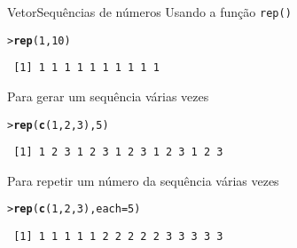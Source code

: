 \documentclass[10pt,handout]{beamer}\usepackage{graphicx, color}
\makeatletter
\newcommand{\hlfunctioncall}[1]{\textcolor[rgb]{0,0,0.545098039215686}{\textbf{#1}}}%
\newenvironment{kframe}{%
 \def\at@end@of@kframe{}%
 \ifinner\ifhmode%
  \def\at@end@of@kframe{\end{minipage}}%
  \begin{minipage}{\columnwidth}%
 \fi\fi%
 \def\FrameCommand##1{\hskip\@totalleftmargin \hskip-\fboxsep
 \colorbox{shadecolor}{##1}\hskip-\fboxsep
     \hskip-\linewidth \hskip-\@totalleftmargin \hskip\columnwidth}%
 \MakeFramed {\advance\hsize-\width
   \@totalleftmargin\z@ \linewidth\hsize
   \@setminipage}}%
 {\par\unskip\endMakeFramed%
 \at@end@of@kframe}
\newenvironment{knitrout}{}{} %
\makeatother
\begin{document}
\begin{frame}[fragile=singleslide]{Vetor}{Sequências de números}
  Usando a função \verb|rep()|
\begin{knitrout}\small
{}\color{fgcolor}\begin{kframe}
\begin{alltt}
> \hlfunctioncall{rep}(1, 10)
\end{alltt}
\begin{verbatim}
 [1] 1 1 1 1 1 1 1 1 1 1
\end{verbatim}
\end{kframe}
\end{knitrout}

Para gerar um sequência várias vezes
\begin{knitrout}\small
{}\color{fgcolor}\begin{kframe}
\begin{alltt}
> \hlfunctioncall{rep}(\hlfunctioncall{c}(1, 2, 3), 5)
\end{alltt}
\begin{verbatim}
 [1] 1 2 3 1 2 3 1 2 3 1 2 3 1 2 3
\end{verbatim}
\end{kframe}
\end{knitrout}

Para repetir um número da sequência várias vezes
\begin{knitrout}\small
{}\color{fgcolor}\begin{kframe}
\begin{alltt}
> \hlfunctioncall{rep}(\hlfunctioncall{c}(1, 2, 3), each = 5)
\end{alltt}
\begin{verbatim}
 [1] 1 1 1 1 1 2 2 2 2 2 3 3 3 3 3
\end{verbatim}
\end{kframe}
\end{knitrout}

\end{frame}
\end{document}
